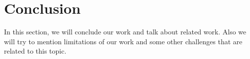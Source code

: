 \section{Conclusion} \label{sec:conclusion}

In this section, we will conclude our work and talk about related work. 
Also we will try to mention limitations of our work and some other challenges 
that are related to this topic.


